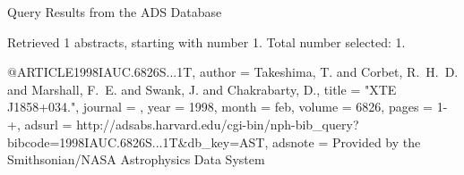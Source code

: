 Query Results from the ADS Database


Retrieved 1 abstracts, starting with number 1.  Total number selected: 1.

@ARTICLE{1998IAUC.6826S...1T,
   author = {{Takeshima}, T. and {Corbet}, R.~H.~D. and {Marshall}, F.~E. and 
	{Swank}, J. and {Chakrabarty}, D.},
    title = "{XTE J1858+034.}",
  journal = {\iaucirc},
     year = 1998,
    month = feb,
   volume = 6826,
    pages = {1-+},
   adsurl = {http://adsabs.harvard.edu/cgi-bin/nph-bib_query?bibcode=1998IAUC.6826S...1T&db_key=AST},
  adsnote = {Provided by the Smithsonian/NASA Astrophysics Data System}
}


